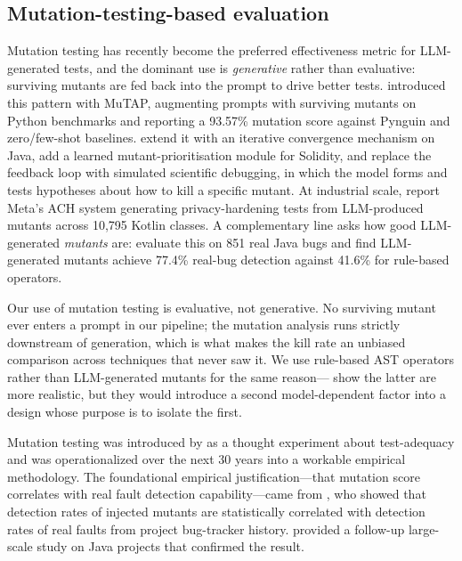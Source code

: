 \documentclass[smallextended]{svjour3}
\begin{document}
\subsection{Mutation-testing-based evaluation}\label{sec:related-mutation}

Mutation testing has recently become the preferred effectiveness
metric for LLM-generated tests, and the dominant use is
\emph{generative} rather than evaluative: surviving mutants are fed
back into the prompt to drive better tests.
\citet{dakhel2024mutation} introduced this pattern with MuTAP,
augmenting prompts with surviving mutants on Python benchmarks and
reporting a 93.57\% mutation score against Pynguin and zero/few-shot
baselines. \citet{wang2026mutgen} extend it with an iterative
convergence mechanism on Java, \citet{bouafif2025primg} add a
learned mutant-prioritisation module for Solidity, and
\citet{straubinger2025debug} replace the feedback loop with
simulated scientific debugging, in which the model forms and tests
hypotheses about how to kill a specific mutant. At industrial scale,
\citet{foster2025ach} report Meta's ACH system generating
privacy-hardening tests from LLM-produced mutants across 10{,}795
Kotlin classes. A complementary line asks how good LLM-generated
\emph{mutants} are: \citet{wang2026mutationstudy} evaluate this on
851 real Java bugs and find LLM-generated mutants achieve 77.4\%
real-bug detection against 41.6\% for rule-based operators.

Our use of mutation testing is evaluative, not generative. No
surviving mutant ever enters a prompt in our pipeline; the mutation
analysis runs strictly downstream of generation, which is what makes
the kill rate an unbiased comparison across techniques that never saw
it. We use rule-based AST operators rather than LLM-generated
mutants for the same reason---\citet{wang2026mutationstudy} show the
latter are more realistic, but they would introduce a second
model-dependent factor into a design whose purpose is to isolate
the first.

Mutation testing was introduced by \citet{demillo1978} as a thought
experiment about test-adequacy and was operationalized over the
next 30 years into a workable empirical methodology. The
foundational empirical justification—that mutation score
correlates with real fault detection capability—came from
\citet{andrews2005}, who showed that detection rates of injected
mutants are statistically correlated with detection rates of real
faults from project bug-tracker history. \citet{just2014} provided
a follow-up large-scale study on Java projects that confirmed the
result.
\end{document}
